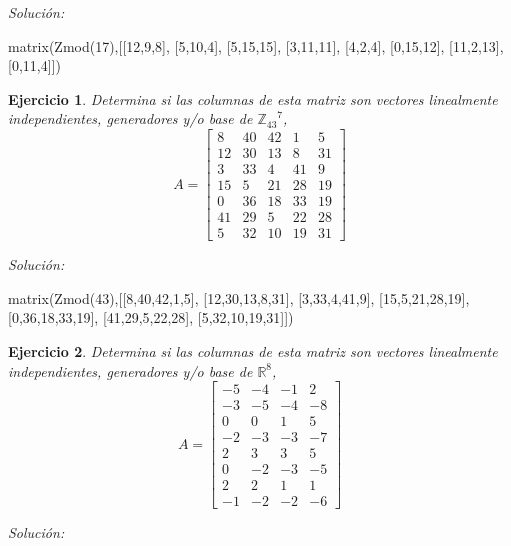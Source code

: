 \documentclass{amsart}
\newtheorem{ejer}{Ejercicio}
\begin{document}
{\it Soluci\'on:}

\begin{sageblock}
matrix(Zmod(17),[[12,9,8],
[5,10,4],
[5,15,15],
[3,11,11],
[4,2,4],
[0,15,12],
[11,2,13],
[0,11,4]])
\end{sageblock}



\begin{ejer} Determina si las columnas de esta matriz son vectores linealmente independientes, generadores y/o base de ${{\mathbb Z}_{43}}^{7}$,
\[ A = \left[\begin{array}{rrrrr}
8 & 40 & 42 & 1 & 5 \\
12 & 30 & 13 & 8 & 31 \\
3 & 33 & 4 & 41 & 9 \\
15 & 5 & 21 & 28 & 19 \\
0 & 36 & 18 & 33 & 19 \\
41 & 29 & 5 & 22 & 28 \\
5 & 32 & 10 & 19 & 31
\end{array}\right] \]
\end{ejer}

{\it Soluci\'on:}

\begin{sageblock}
matrix(Zmod(43),[[8,40,42,1,5],
[12,30,13,8,31],
[3,33,4,41,9],
[15,5,21,28,19],
[0,36,18,33,19],
[41,29,5,22,28],
[5,32,10,19,31]])
\end{sageblock}



\begin{ejer} Determina si las columnas de esta matriz son vectores linealmente independientes, generadores y/o base de ${{\mathbb R}}^{8}$,
\[ A = \left[\begin{array}{rrrr}
-5 & -4 & -1 & 2 \\
-3 & -5 & -4 & -8 \\
0 & 0 & 1 & 5 \\
-2 & -3 & -3 & -7 \\
2 & 3 & 3 & 5 \\
0 & -2 & -3 & -5 \\
2 & 2 & 1 & 1 \\
-1 & -2 & -2 & -6
\end{array}\right] \]
\end{ejer}

{\it Soluci\'on:}
\end{document}
